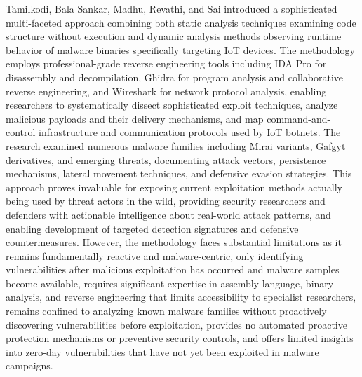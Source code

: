 Tamilkodi, Bala Sankar, Madhu, Revathi, and Sai introduced \cite{tamilkodi2024malware} a sophisticated multi-faceted approach combining both static analysis techniques examining code structure without execution and dynamic analysis methods observing runtime behavior of malware binaries specifically targeting IoT devices. The methodology employs professional-grade reverse engineering tools including IDA Pro for disassembly and decompilation, Ghidra for program analysis and collaborative reverse engineering, and Wireshark for network protocol analysis, enabling researchers to systematically dissect sophisticated exploit techniques, analyze malicious payloads and their delivery mechanisms, and map command-and-control infrastructure and communication protocols used by IoT botnets. The research examined numerous malware families including Mirai variants, Gafgyt derivatives, and emerging threats, documenting attack vectors, persistence mechanisms, lateral movement techniques, and defensive evasion strategies. This approach proves invaluable for exposing current exploitation methods actually being used by threat actors in the wild, providing security researchers and defenders with actionable intelligence about real-world attack patterns, and enabling development of targeted detection signatures and defensive countermeasures. However, the methodology faces substantial limitations as it remains fundamentally reactive and malware-centric, only identifying vulnerabilities after malicious exploitation has occurred and malware samples become available, requires significant expertise in assembly language, binary analysis, and reverse engineering that limits accessibility to specialist researchers, remains confined to analyzing known malware families without proactively discovering vulnerabilities before exploitation, provides no automated proactive protection mechanisms or preventive security controls, and offers limited insights into zero-day vulnerabilities that have not yet been exploited in malware campaigns.

